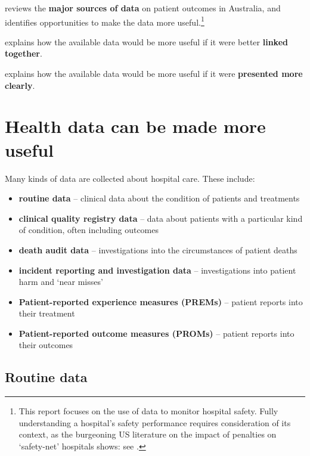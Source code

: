 \documentclass[FrontPage]{grattan}
\begin{document}
 reviews the \textbf{major sources of data} on patient outcomes in Australia, and identifies opportunities to make the data more useful.\footnote{This report focuses on the use of data to monitor hospital safety. Fully understanding a hospital’s safety performance requires consideration of its context, as the burgeoning US literature on the impact of penalties on ‘safety-net’ hospitals shows: see \textcites{RN18}{RN17}.}

 explains how the available data would be more useful if it were better \textbf{linked together}.

 explains how the available data would be more useful if it were \textbf{presented more clearly}.

\chapter{Health data can be made more useful}\label{chap:use}

Many kinds of data are collected about hospital care. These include:
\begin{itemize}
    \item \textbf{routine data} -- clinical data about the condition of patients and treatments
     \item \textbf{clinical quality registry data} -- data about patients with a particular kind of condition, often including outcomes
     \item \textbf{death audit data} -- investigations into the circumstances of patient deaths
     \item \textbf{incident reporting and investigation data} -- investigations into patient harm and `near misses'
     \item \textbf{Patient-reported experience measures (PREMs)} -- patient reports into their treatment
     \item \textbf{Patient-reported outcome measures (PROMs)} -- patient reports into their outcomes
\end{itemize}

\section{Routine data}\label{sec:routine}
\end{document}
